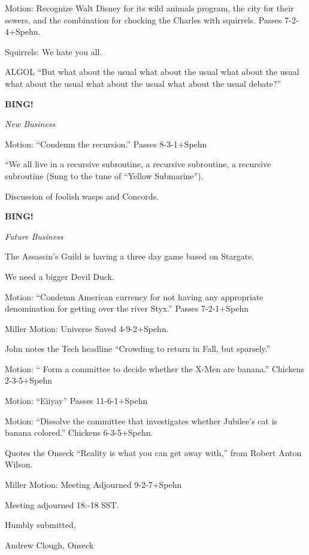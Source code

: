 \documentclass[12pt]{article}
\newcommand{\bing}{{\bf BING!} }
\newcommand{\goto}[1]{\bing \vskip 12pt \centerline{{\em{#1}}}}
\begin{document}
Motion:  Recognize Walt Disney for its wild animals program, the city for their sewers, and the combination for chocking the Charles with squirrels.  Passes 7-2-4+Spehn.

Squirrels:  We hate you all.

ALGOL  ``But what about the usual what about the usual what about the usual what about the usual what about the usual what about the usual debate?''

\goto{New Business}

Motion:  ``Condemn the recursion.''  Passes 8-3-1+Spehn

``We all live in a recursive subroutine, a recursive subroutine, a recursive subroutine (Sung to the tune of ``Yellow Submarine'').

Discussion of foolish wasps and Concords.

\goto{Future Business}

The Assassin's Guild is having a three day game based on Stargate.

We need a bigger Devil Duck.

Motion:  ``Condemn American currency for not having any appropriate denomination for getting over the river Styx.''  Passes 7-2-1+Spehn

Miller Motion:  Universe Saved 4-9-2+Spehn.

John notes the Tech headline ``Crowding to return in Fall, but sparsely.''

Motion: `` Form a committee to decide whether the X-Men are banana.''  Chickens 2-3-5+Spehn

Motion:  ``Eiiyay''  Passes 11-6-1+Spehn

Motion:  ``Dissolve the committee that investigates whether Jubilee's cat is banana colored.'' Chickens 6-3-5+Spehn.

Quotes the Onseck ``Reality is what you can get away with,'' from Robert Anton Wilson.

Miller Motion:  Meeting Adjourned 9-2-7+Spehn

\vspace{12pt}

\noindent
Meeting adjourned 18:-18 SST.

\vspace{18pt}

\centerline{Humbly submitted,}
\centerline{Andrew Clough, Onseck}
\end{document}

